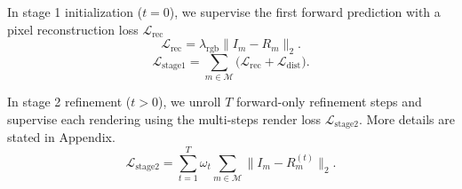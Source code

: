 In stage 1 initialization ($t{=}0$), we supervise the first forward prediction with a pixel reconstruction loss $\mathcal{L}_{\mathrm{rec}}$%
\begin{equation}
\mathcal{L}_{\mathrm{rec}} =
\lambda_{\mathrm{rgb}}\|I_m - R_m\|_2.
\end{equation}
\begin{equation}
    \mathcal{L}_{\mathrm{stage1}}
=\sum_{m\in\mathcal{M}}\big(
\mathcal{L}_{\mathrm{rec}}+\mathcal{L}_{\mathrm{dist}}
\big).
\end{equation}

In stage 2 refinement ($t{>}0$), we unroll $T$ forward-only refinement steps and supervise each rendering using
the multi-steps render loss $ \mathcal{L}_{\mathrm{stage2}}$. More details are stated in Appendix.
\begin{equation}
    \mathcal{L}_{\mathrm{stage2}}
=\sum_{t=1}^{T}\omega_t\sum_{m\in\mathcal{M}}
\|I_m - R_m^{(t)}\|_2.
\end{equation}
